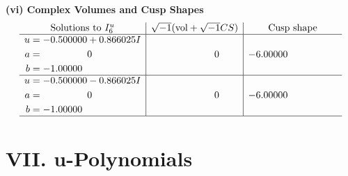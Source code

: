 \documentclass[1p]{elsarticle_modified}
\theoremstyle{definition}
\newcommand{\I}{\sqrt{-1}}
\begin{document}
\newpage\flushleft \textbf{(vi) Complex Volumes and Cusp Shapes}
$$\begin{array}{c|c|c}  
\text{Solutions to }I^u_{6}& \I (\text{vol} + \sqrt{-1}CS) & \text{Cusp shape}\\
 \hline 
\begin{aligned}
u &= -0.500000 + 0.866025 I \\
a &= \phantom{-0.000000 } 0 \\
b &= -1.00000\phantom{ +0.000000I}\end{aligned}
 & \phantom{-0.000000 } 0 & -6.00000\phantom{ +0.000000I} \\ \hline\begin{aligned}
u &= -0.500000 - 0.866025 I \\
a &= \phantom{-0.000000 } 0 \\
b &= -1.00000\phantom{ +0.000000I}\end{aligned}
 & \phantom{-0.000000 } 0 & -6.00000\phantom{ +0.000000I}\\
 \hline 
 \end{array}$$\newpage
\newpage\renewcommand{\arraystretch}{1}
\centering \section*{ VII. u-Polynomials}
\end{document}
